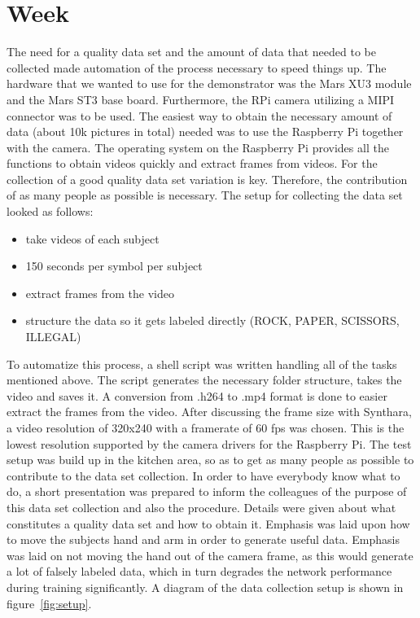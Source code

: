\chapter{Week}
The need for a quality data set and the amount of data that needed to be collected made automation of the process necessary to speed things up. The hardware that we wanted to use for the demonstrator was the Mars XU3 module and the Mars ST3 base board. Furthermore, the RPi camera utilizing a \ac{MIPI} connector was to be used. The easiest way to obtain the necessary amount of data (about 10k pictures in total) needed was to use the Raspberry Pi together with the camera. The operating system on the Raspberry Pi provides all the functions to obtain videos quickly and extract frames from videos. For the collection of a good quality data set variation is key. Therefore, the contribution of as many people as possible is necessary. The setup for collecting the data set looked as follows:
\begin{itemize}
	\item take videos of each subject
	\item 150 seconds per symbol per subject
	\item extract frames from the video
	\item structure the data so it gets labeled directly (ROCK, PAPER, SCISSORS, ILLEGAL)
\end{itemize}
To automatize this process, a shell script was written handling all of the tasks mentioned above. The script generates the necessary folder structure, takes the video and saves it. A conversion from .h264 to .mp4 format is done to easier extract the frames from the video. After discussing the frame size with Synthara, a video resolution of 320x240 with a framerate of 60 fps was chosen. This is the lowest resolution supported by the camera drivers for the Raspberry Pi.
The test setup was build up in the kitchen area, so as to get as many people as possible to contribute to the data set collection. In order to have everybody know what to do, a short presentation was prepared to inform the colleagues of the purpose of this data set collection and also the procedure. Details were given about what constitutes a quality data set and how to obtain it. Emphasis was laid upon how to move the subjects hand and arm in order to generate useful data. Emphasis was laid on not moving the hand out of the camera frame, as this would generate a lot of falsely labeled data, which in turn degrades the network performance during training significantly. A diagram of the data collection setup is shown in figure~\ref{fig:setup}.
